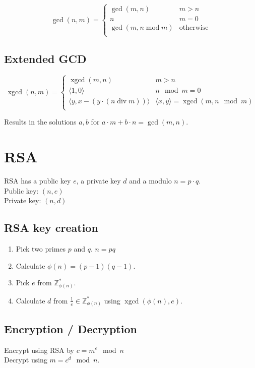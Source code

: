 \documentclass{article}
\newcommand{\ZZ}{\mathbb{Z}}
\newcommand{\Z}{\ZZ}
\newcommand{\egcd}{\operatorname{xgcd}}
\begin{document}
\[ 
  \gcd (n,m) = \begin{cases}
    \gcd(m,n) & m > n \\
    n & m=0 \\
    \gcd(m, n \operatorname{mod} m) & \text{otherwise}\\
  \end{cases}
\]

\subsection{Extended GCD}

\[
  \egcd(n,m) = \begin{cases}
    \egcd(m,n) & m > n \\
    \langle 1,0 \rangle & n \mod m = 0 \\
    \langle y, x - (y \cdot (n \operatorname{div} m))\rangle & \langle x, y \rangle = \egcd(m, n \mod m) \\
  \end{cases}
\]

Results in the solutions $a,b$ for $a \cdot m + b \cdot n = \gcd(m,n)$.

\section{RSA}

RSA has a public key $e$, a private key $d$ and a modulo $n=p\cdot q$. \\
Public key: $(n, e)$\\
Private key: $(n,d)$ \\

\subsection{RSA key creation}
\begin{enumerate}
  \item Pick two primes $p$ and $q$. $n=pq$
  \item Calculate $\phi(n) = (p-1)(q-1)$.
  \item Pick $e$ from $\Z^*_{\phi(n)}$.
  \item Calculate $d$ from $\frac{1}{e} \in \Z^*_{\phi(n)}$ using $\egcd(\phi(n),e)$.
\end{enumerate}

\subsection{Encryption / Decryption}
Encrypt using RSA by $c = m^e \mod n$\\
Decrypt using $m = c^d \mod n$.
\end{document}
